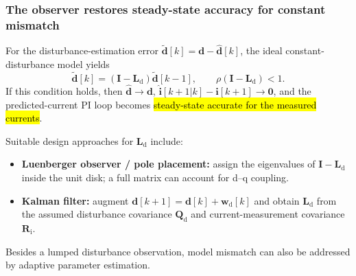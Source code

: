 \begin{frame}
    \frametitle{The observer restores steady-state accuracy for constant mismatch}
    For the disturbance-estimation error $\widetilde{\bm{d}}[k]=\bm{d}-\hat{\bm{d}}[k]$, the ideal constant-disturbance model yields
    \begin{equation}
        \widetilde{\bm{d}}[k]
        =\left(\bm{I}-\bm{L}_{\mathrm{d}}\right)\widetilde{\bm{d}}[k-1],
        \qquad \rho\!\left(\bm{I}-\bm{L}_{\mathrm{d}}\right)<1.
    \end{equation}\pause%
    If this condition holds,
    then $\hat{\bm{d}}\rightarrow\bm{d}$, $\hat{\bm{i}}[k+1|k]-\bm{i}[k+1]\rightarrow\bm{0}$, and the predicted-current PI loop becomes \hl{steady-state accurate for the measured currents}.\pause%
    \par\vspace{0.08cm}
    Suitable design approaches for $\bm{L}_{\mathrm{d}}$ include:
    \begin{itemize}
        \item \textbf{Luenberger observer / pole placement:} assign the eigenvalues of $\bm{I}-\bm{L}_{\mathrm{d}}$ inside the unit disk; a full matrix can account for d--q coupling.\pause%
        \item \textbf{Kalman filter:} augment $\bm{d}[k+1]=\bm{d}[k]+\bm{w}_{\mathrm{d}}[k]$ and obtain $\bm{L}_{\mathrm{d}}$ from the assumed disturbance covariance $\bm{Q}_{\mathrm{d}}$ and current-measurement covariance $\bm{R}_{\mathrm{i}}$.\pause%
    \end{itemize}
    Besides a lumped disturbance observation, model mismatch can also be addressed by adaptive parameter estimation.
\end{frame}

